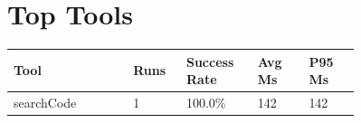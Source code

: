 \documentclass[11pt]{article}
\begin{document}
\section*{Top Tools}
\begin{longtable}{p{0.28\linewidth} p{0.10\linewidth} p{0.14\linewidth} p{0.12\linewidth} p{0.12\linewidth}}
\toprule
Tool & Runs & Success Rate & Avg Ms & P95 Ms \\
\midrule
\endhead
searchCode & 1 & 100.0\% & 142 & 142 \\
\bottomrule
\end{longtable}
\end{document}
